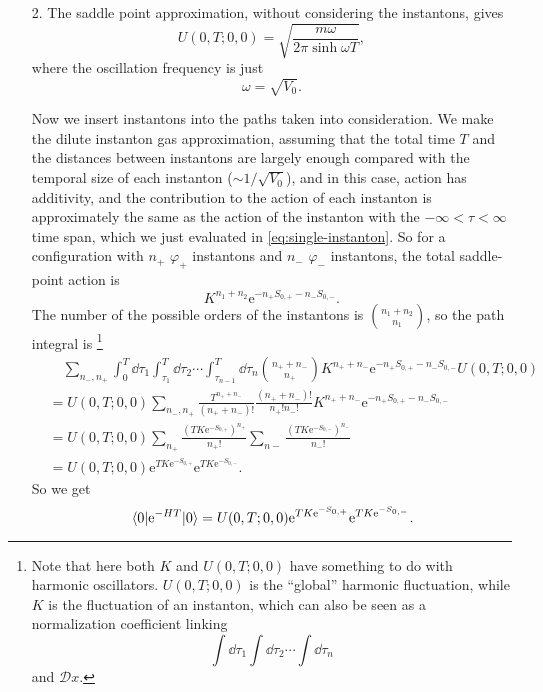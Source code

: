 \documentclass[hyperref, a4paper]{article}
\newcommand*{\ee}{\mathrm{e}}
\newcommand*{\fd}[1]{\mathcal{D} #1}
\begin{document}
\begin{itemize}
\item[2.] The saddle point approximation, without considering the instantons, gives 
\begin{equation}
    U(0, T; 0, 0) = \sqrt{\frac{m \omega}{2 \pi \sinh \omega T}},
\end{equation}
where the oscillation frequency is just 
\begin{equation}
    \omega = \sqrt{V_0}.
\end{equation}

Now we insert instantons into the paths taken into consideration.
We make the dilute instanton gas approximation,
assuming that the total time $T$ and the distances between instantons 
are largely enough compared with the temporal size of each instanton ($\sim 1 / \sqrt{V_0}$),
and in this case, action has additivity,
and the contribution to the action of each instanton 
is approximately the same as the action of the instanton with
the $-\infty < \tau < \infty$ time span,
which we just evaluated in \eqref{eq:single-instanton}.
So for a configuration with $n_+$ $\varphi_+$ instantons and $n_-$ $\varphi_-$ instantons,
the total saddle-point action is 
\[
    K^{n_1 + n_2} \ee^{- n_+ S_{0, +} - n_- S_{0, -}}.
\]
The number of the possible orders of the instantons is $\binom{n_1 + n_2}{n_1}$,
so the path integral is%
\footnote{
    Note that here both $K$ and $U(0, T; 0, 0)$ have something to do with harmonic oscillators.
    $U(0, T; 0, 0)$ is the ``global'' harmonic fluctuation,
    while $K$ is the fluctuation of an instanton,
    which can also be seen as a normalization coefficient 
    linking 
    \[
        \int \dd{\tau_1} \int \dd{\tau_2} \cdots \int \dd{\tau_n}
    \]
    and $\fd{x}$.
} 
\[
    \begin{aligned}
        &\quad \sum_{n_-, n_+} 
        \int_{0}^T \dd{\tau_1} \int_{\tau_1}^T \dd{\tau_2} \cdots \int_{\tau_{n-1}}^T \dd{\tau_n}
        \binom{n_+ + n_-}{n_+} K^{n_+ + n_-} \ee^{- n_+ S_{0, +} - n_- S_{0, -}}
        U(0, T; 0, 0) \\
        &= U(0, T; 0, 0) \sum_{n_-, n_+} \frac{T^{n_+ + n_-}}{(n_+ + n_-) !} 
        \frac{(n_+ + n_-) !}{n_+! n_-!} 
        K^{n_+ + n_-} \ee^{- n_+ S_{0, +} - n_- S_{0, -}} \\
        &= U(0, T; 0, 0) \sum_{n_+} \frac{(T K \ee^{- S_{0, +}})^{n_+}}{n_+!} 
        \sum_{n-} \frac{(T K \ee^{- S_{0, -}})^{n_-}}{n_-!} \\
        &= U(0, T; 0, 0) \ee^{TK \ee^{- S_{0,+}}} \ee^{TK \ee^{- S_{0,-}}}.
    \end{aligned}
\]
So we get 
\begin{equation}
    \expval{\ee^{- H T}}{0} = U(0, T; 0, 0) \ee^{TK \ee^{- S_{0,+}}} \ee^{TK \ee^{- S_{0,-}}}.
\end{equation}


\end{itemize}
\end{document}
